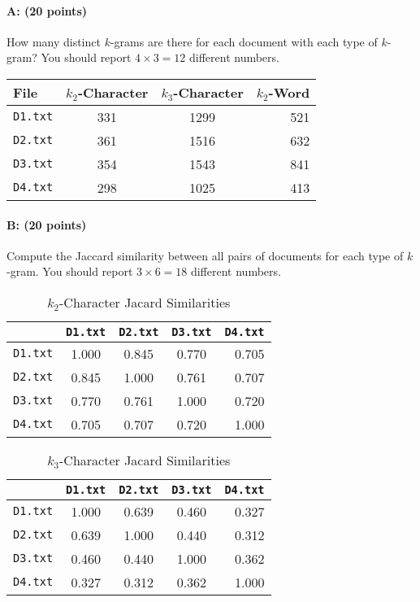 \documentclass[11pt]{article}
\begin{document}
\paragraph{A: (20 points)}  How many distinct $k$-grams are there for each document with each type of $k$-gram?    You should report $4 \times 3 = 12$ different numbers.  

\begin{table}[H]
\centering
\begin{tabular}{lccr}
\hline\hline
{\bf File} & {\bf $k_{2}$-Character} & {\bf $k_{3}$-Character} & {\bf $k_{2}$-Word}\\
\hline
{\tt D1.txt} & 331 & 1299 & 521\\
{\tt D2.txt} & 361 & 1516 & 632\\
{\tt D3.txt} & 354 & 1543 & 841\\
{\tt D4.txt} & 298 & 1025 & 413\\
\hline\hline
\end{tabular}
\end{table}

\paragraph{B: (20 points)}  Compute the Jaccard similarity between all pairs of documents for each type of $k$-gram.  You should report $3 \times 6 = 18$ different numbers.  

\begin{table}[H]
\centering
\caption{$k_{2}$-Character Jacard Similarities}
\begin{tabular}{l|cccr}
\hline\hline
& {\tt D1.txt} &{\tt D2.txt} &{\tt D3.txt} &{\tt D4.txt} \\
\hline
{\tt D1.txt} &1.000& 0.845& 0.770& 0.705\\
{\tt D2.txt} &0.845& 1.000& 0.761& 0.707\\
{\tt D3.txt} &0.770& 0.761& 1.000& 0.720\\
{\tt D4.txt} &0.705& 0.707& 0.720& 1.000\\
\hline\hline
\end{tabular}
\end{table}


\begin{table}[H]
\centering
\caption{$k_{3}$-Character Jacard Similarities}
\begin{tabular}{l|cccr}
\hline\hline
& {\tt D1.txt} &{\tt D2.txt} &{\tt D3.txt} &{\tt D4.txt} \\
\hline
{\tt D1.txt} &1.000& 0.639& 0.460& 0.327\\
{\tt D2.txt} &0.639& 1.000& 0.440& 0.312\\
{\tt D3.txt} &0.460& 0.440& 1.000& 0.362\\
{\tt D4.txt} &0.327& 0.312& 0.362& 1.000\\
\hline\hline
\end{tabular}
\end{table}
\end{document}
